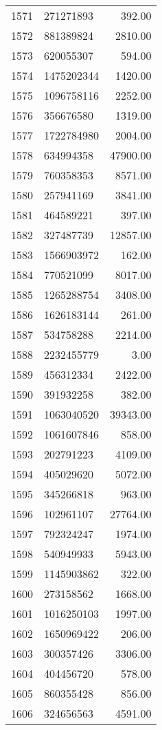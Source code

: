 \begin{table}[ht]
\begin{tabular}{rlr}
  1571 & 271271893 & 392.00 \\ 
  1572 & 881389824 & 2810.00 \\ 
  1573 & 620055307 & 594.00 \\ 
  1574 & 1475202344 & 1420.00 \\ 
  1575 & 1096758116 & 2252.00 \\ 
  1576 & 356676580 & 1319.00 \\ 
  1577 & 1722784980 & 2004.00 \\ 
  1578 & 634994358 & 47900.00 \\ 
  1579 & 760358353 & 8571.00 \\ 
  1580 & 257941169 & 3841.00 \\ 
  1581 & 464589221 & 397.00 \\ 
  1582 & 327487739 & 12857.00 \\ 
  1583 & 1566903972 & 162.00 \\ 
  1584 & 770521099 & 8017.00 \\ 
  1585 & 1265288754 & 3408.00 \\ 
  1586 & 1626183144 & 261.00 \\ 
  1587 & 534758288 & 2214.00 \\ 
  1588 & 2232455779 & 3.00 \\ 
  1589 & 456312334 & 2422.00 \\ 
  1590 & 391932258 & 382.00 \\ 
  1591 & 1063040520 & 39343.00 \\ 
  1592 & 1061607846 & 858.00 \\ 
  1593 & 202791223 & 4109.00 \\ 
  1594 & 405029620 & 5072.00 \\ 
  1595 & 345266818 & 963.00 \\ 
  1596 & 102961107 & 27764.00 \\ 
  1597 & 792324247 & 1974.00 \\ 
  1598 & 540949933 & 5943.00 \\ 
  1599 & 1145903862 & 322.00 \\ 
  1600 & 273158562 & 1668.00 \\ 
  1601 & 1016250103 & 1997.00 \\ 
  1602 & 1650969422 & 206.00 \\ 
  1603 & 300357426 & 3306.00 \\ 
  1604 & 404456720 & 578.00 \\ 
  1605 & 860355428 & 856.00 \\ 
  1606 & 324656563 & 4591.00 \\ 

\end{tabular}
\end{table}
